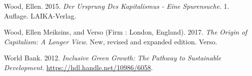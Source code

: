 \documentclass[
  british,
  a4paper,
  DIV=11,
  numbers=noendperiod,
  oneside,
  openany]{scrreprt}
\newlength{\cslhangindent}
\newenvironment{CSLReferences}[2] %
 {\begin{list}{}{%
  \setlength{\itemindent}{0pt}
  \setlength{\leftmargin}{0pt}
  \setlength{\parsep}{0pt}
  \ifodd #1
   \setlength{\leftmargin}{\cslhangindent}
   \setlength{\itemindent}{-1\cslhangindent}
  \fi
  \setlength{\itemsep}{#2\baselineskip}}}
 {\end{list}}
\begin{document}
\begin{CSLReferences}{1}{1}
Wood, Ellen. 2015. \emph{Der Ursprung Des Kapitalismus - Eine
Spurensuche}. 1. Auflage. LAIKA-Verlag.

Wood, Ellen Meiksins, and Verso (Firm : London, England). 2017.
\emph{The Origin of Capitalism: A Longer View}. New, revised and
expanded edition. Verso.

World Bank. 2012. \emph{Inclusive {Green} {Growth}: {The} {Pathway} to
{Sustainable} {Development}}. \url{https://hdl.handle.net/10986/6058}.

\end{CSLReferences}
\end{document}

